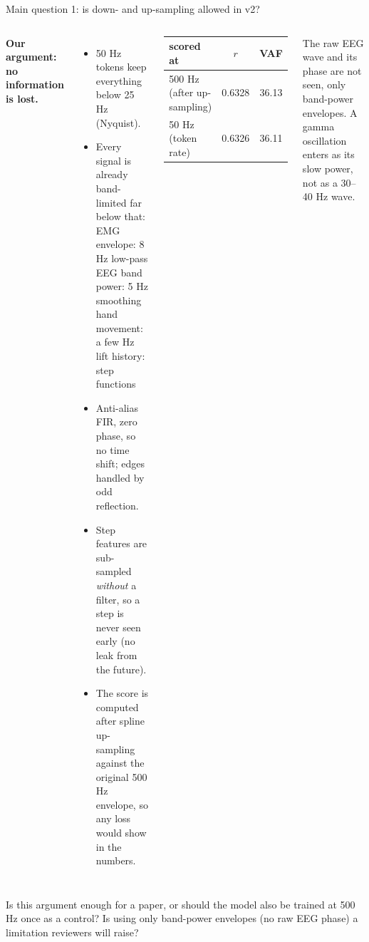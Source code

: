 \documentclass[aspectratio=169,10pt]{beamer}
\newcommand{\Verify}[1]{\begin{tcolorbox}[askbox,title={Check with the supervisor}]#1\end{tcolorbox}}
\begin{document}
\begin{frame}{Main question 1: is down- and up-sampling allowed in v2?}
  \begin{columns}[T]
    \textbf{Our argument: no information is lost.}
    \begin{itemize}\scriptsize
      \item 50 Hz tokens keep everything below 25 Hz (Nyquist).
      \item Every signal is already band-limited far below that:\\
        EMG envelope: 8 Hz low-pass \quad EEG band power: 5 Hz smoothing\\
        hand movement: a few Hz \quad lift history: step functions
      \item Anti-alias FIR, zero phase, so no time shift; edges handled by odd reflection.
      \item Step features are sub-sampled \emph{without} a filter, so a step is never seen early (no leak from the future).
      \item The score is computed after spline up-sampling against the original 500 Hz envelope, so any loss would show
            in the numbers.
    \end{itemize}
    \begin{tcolorbox}[stagebox,title={Direct check (v3, E0, 12 participants)}]
      \centering\scriptsize
      \begin{tabular}{lcc}
        \toprule
        scored at & $r$ & VAF \\
        \midrule
        500 Hz (after up-sampling) & 0.6328 & 36.13 \\
        50 Hz (token rate) & 0.6326 & 36.11 \\
        \bottomrule
      \end{tabular}
    \end{tcolorbox}
    \vspace{2pt}
    \begin{tcolorbox}[notebox,title={What the token rate does give up}]
      The raw EEG wave and its phase are not seen, only band-power envelopes. A gamma oscillation enters as its slow
      power, not as a 30--40 Hz wave.
    \end{tcolorbox}
  \end{columns}
  \Verify{\scriptsize Is this argument enough for a paper, or should the model also be trained at 500 Hz once as a control? Is using only band-power envelopes (no raw EEG phase) a limitation reviewers will raise?}
\end{frame}
\end{document}
